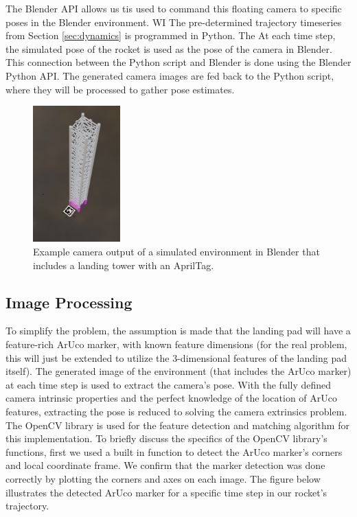 \documentclass[conference]{IEEEtran}
\begin{document}
The Blender API allows us tis used to command this floating camera to specific poses in the Blender environment. WI
The pre-determined trajectory timeseries from Section \ref{sec:dynamics} is programmed in Python. The 
At each time step, the simulated pose of the rocket is used as the pose of the camera in Blender. This connection between the Python script and Blender is done using the Blender Python API. The generated camera images are fed back to the Python script, where they will be processed to gather pose estimates.  

\begin{figure}[htbp] \label{fig:flow_chart}
    \centerline{\includegraphics[width=0.3\textwidth]{april_tag_on_booster.png}}
    \caption{Example camera output of a simulated environment in Blender that includes a landing tower with an AprilTag.}
    \label{fig:sys_arch}
\end{figure}

\subsection{Image Processing}

To simplify the problem, the assumption is made that the landing pad will have a feature-rich ArUco marker, with known feature dimensions (for the real problem, this will just be extended to utilize the 3-dimensional features of the landing pad itself). 
The generated image of the environment (that includes the ArUco marker) at each time step is used to extract the camera's pose. 
With the fully defined camera intrinsic properties and the perfect knowledge of the location of ArUco features, extracting the pose is reduced to solving the camera extrinsics problem. 
The OpenCV library is used for the feature detection and matching algorithm for this implementation.
To briefly discuss the specifics of the OpenCV library's functions, first we used a built in function to detect the ArUco marker's corners and local coordinate frame. 
We confirm that the marker detection was done correctly by plotting the corners and axes on each image. 
The figure below illustrates the detected ArUco marker for a specific time step in our rocket's trajectory.
\end{document}
